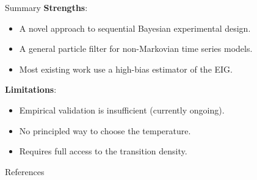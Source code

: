 \documentclass[10pt, aspectratio=1610]{beamer}
\begin{document}
    \begin{frame}{Summary}
      \textbf{Strengths}:\vspace{1em}
      \begin{itemize}
        \setlength\itemsep{1em}
        \item A novel approach to sequential Bayesian experimental design.
        \item A general particle filter for non-Markovian time series models.
        \item Most existing work use a high-bias estimator of the EIG.
      \end{itemize}
      \vspace{1em}
      \textbf{Limitations}:\vspace{1em}
      \begin{itemize}
        \setlength\itemsep{1em}
        \item Empirical validation is insufficient (currently ongoing).
        \item No principled way to choose the temperature.
        \item Requires full access to the transition density.
      \end{itemize}
    \end{frame}

  \begin{frame}[t, allowframebreaks]{References}
    
  \end{frame}

  \appendix
\end{document}
